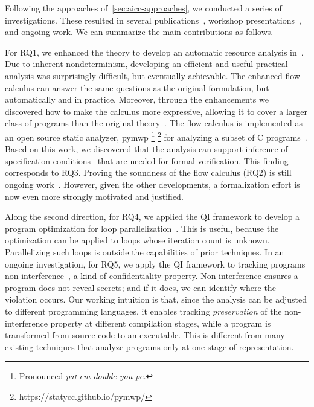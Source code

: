 Following the approaches of~\autoref{sec:aicc-approaches}, we conducted a series of
investigations. These resulted in several
publications~\cite{aubert20222,aubert20232,aubert2023b}, workshop
presentations~\cite{aubert20231,aubert202217,splash22}, and ongoing work.
We can summarize the main contributions as follows.

For RQ1, we enhanced the theory to develop an automatic resource analysis
in~\cite{aubert20222,aubert2023b,rusch2025}. Due to inherent nondeterminism,
developing an efficient and useful practical analysis was surprisingly
difficult, but eventually achievable. The enhanced flow calculus can answer the
same questions as the original formulation, but automatically and in practice.
Moreover, through the enhancements we discovered how to make the calculus more
expressive, allowing it to cover a larger class of programs than the original
theory~\cite{rusch2025}. The flow calculus is implemented as an open source
static analyzer, pymwp%
\footnote{Pronounced \emph{pa\textsc{i} em double-you p\={e}.}}%
\footnote{https://statycc.github.io/pymwp/}{ }
for analyzing a subset of C programs~\cite{aubert2023b}. Based on this work, we
discovered that the analysis can support inference of specification
conditions~\cite{rusch2025} that are needed for formal verification. This
finding corresponds to RQ3. Proving the soundness of the flow calculus (RQ2) is
still ongoing work~\cite{aubert20232}. However, given the other developments, a
formalization effort is now even more strongly motivated and justified.

Along the second direction, for RQ4, we applied the QI framework to develop a
program optimization for loop parallelization~\cite{aubert20232}. This is useful,
because the optimization can be applied to loops whose iteration count
is unknown. Parallelizing such loops is outside the capabilities of prior
techniques. In an ongoing investigation, for RQ5, we apply the QI
framework to tracking programs {non\hyp{}interference}~\cite{goguen1982}, a kind
of confidentiality property. Non-interference ensures a program does not reveal
secrets; and if it does, we can identify where the violation occurs. Our working
intuition is that, since the analysis can be adjusted to different programming
languages, it enables tracking \emph{preservation} of the non-interference
property at different compilation stages, while a program is transformed from
source code to an executable. This is different from many existing techniques
that analyze programs only at one stage of representation.

